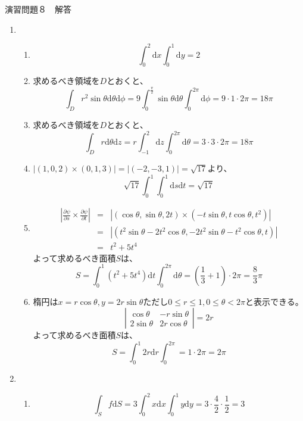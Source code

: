 \documentclass{jarticle}
\def\d{\mathrm d}
\begin{document}
\begin{center} {\Large 演習問題８　解答} \end{center}
\begin{enumerate}
  \item
    \begin{enumerate}
      \item
        \[ \int_0^2 \d x \int_0^1 \d y = 2 \]
      \item
        求めるべき領域を$D$とおくと、
        \[ \int_D r^2 \sin \theta \d \theta \d \phi = 9 \int_0^{\frac{\pi}{2}} \sin \theta \d \theta \int_0^{2\pi} \d \phi = 9 \cdot 1 \cdot 2 \pi = 18 \pi \]
      \item
        求めるべき領域を$D$とおくと、
        \[ \int_D r \d \theta \d z = r \int_{-1}^2 \d z \int_0^{2\pi} \d \theta = 3 \cdot 3 \cdot 2 \pi = 18 \pi \]
      \item
        $|(1,0,2) \times (0,1,3)| = |(-2,-3,1)| = \sqrt{17}$より、
        \[ \sqrt{17} \int_0^1 \int_0^1 \d s \d t = \sqrt{17} \]
      \item
        \begin{eqnarray*}
        \left|\frac{\partial \psi}{\partial s} \times \frac{\partial \psi}{\partial t} \right| & = & \left| (\cos\theta,\sin\theta,2t) \times (-t\sin\theta,t\cos\theta,t^2)\right| \\
        & = & \left| (t^2\sin\theta-2t^2\cos\theta,-2t^2\sin\theta-t^2\cos\theta,t) \right| \\
        & = & t^2+5t^4
        \end{eqnarray*}
        よって求めるべき面積$S$は、
        \[ S = \int_0^1 ( t^2 + 5t^4 ) \d t \int_0^{2\pi} \d \theta = \left( \frac{1}{3}+1 \right) \cdot 2\pi = \frac{8}{3} \pi \]
      \item
        楕円は$x=r\cos\theta,y=2r\sin\theta$ただし$0 \leq r \leq 1, 0 \leq \theta < 2\pi$と表示できる。
        \[ 
          \left| \begin{array}{cc}
            \cos\theta & -r\sin\theta \\
            2\sin\theta & 2r\cos\theta
          \end{array} \right| = 2r
        \]
        よって求めるべき面積$S$は、
        \[
          S = \int_0^1 2r \d r \int_0^{2\pi} = 1 \cdot 2\pi = 2\pi
        \]
    \end{enumerate}
  \item
    \begin{enumerate}
      \item
        \[ \int_S f \d S = 3 \int_0^2 x \d x \int_0^1 y \d y = 3 \cdot \frac{4}{2} \cdot \frac{1}{2} = 3 \]

\end{enumerate}
\end{enumerate}
\end{document}
